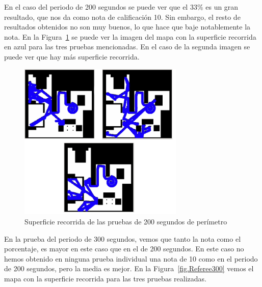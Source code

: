 En el caso del periodo de 200 segundos se puede ver que el 33\% es un gran resultado, que nos da como nota de calificación 10. Sin embargo, el resto de resultados obtenidos no son muy buenos, lo que hace que baje notablemente la nota. En la Figura~\ref{fig.Referee200} se puede ver la imagen del mapa con la superficie recorrida en azul para las tres pruebas mencionadas. En el caso de la segunda imagen se puede ver que hay más superficie recorrida.


\begin{figure}[H]
  \begin{center}
    \includegraphics[width=0.7\textwidth]{figures/Vacuum/Referee200.png}
		\caption{Superficie recorrida de las pruebas de 200 segundos de perímetro}
		\label{fig.Referee200}
		\end{center}
\end{figure}

En la prueba del periodo de 300 segundos, vemos que tanto la nota como el porcentaje, es mayor en este caso que en el de 200 segundos. En este caso no hemos obtenido en ninguna prueba individual una nota de 10 como en el periodo de 200 segundos, pero la media es mejor. En la Figura~\ref{fig.Referee300} vemos el mapa con la superficie recorrida para las tres pruebas realizadas.

